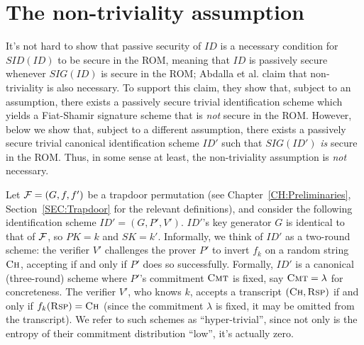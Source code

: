 \section{The non-triviality assumption}
\label{SEC:NonTriviality}

It's not hard to show that passive security of $ID$ is a necessary condition
for $SID(ID)$ to be secure in the ROM, meaning that $ID$ is passively secure
whenever $SIG(ID)$ is secure in the ROM; Abdalla et al. claim that
non-triviality is also necessary. To support this claim, they show that,
subject to an assumption, there exists a passively secure trivial
identification scheme which yields a Fiat-Shamir signature scheme that is
{\it not} secure in the ROM.
However, below we show that, subject to a different assumption, there exists a
passively secure trivial canonical identification scheme $ID'$
such that $SIG(ID')$ {\it is} secure in the ROM. 
Thus, in some sense at least, the non-triviality assumption is {\it not} 
necessary. 

Let $\mathcal{F} = (G,f,f')$ be a trapdoor permutation (see
Chapter~\ref{CH:Preliminaries}, Section~\ref{SEC:Trapdoor} for the relevant
definitions), and consider the following identification scheme $ID' =
(G,P',V')$. $ID'$'s key generator $G$ is identical to that of $\mathcal{F}$, so $PK
= k$ and $SK = k'$.  Informally, we think of $ID'$ as a two-round scheme: the
verifier $V'$ challenges the prover $P'$ to invert $f_k$ on a random string
$\textsc{Ch}$, accepting if and only if $P'$ does so successfully.  Formally,
$ID'$ is a canonical (three-round) scheme where $P'$'s commitment
$\textsc{Cmt}$ is fixed, say $\textsc{Cmt} = \lambda$ for concreteness. The
verifier $V'$, who knows $k$, accepts a transcript
$(\textsc{Ch},\textsc{Rsp})$  if and only if $f_{k}(\textsc{Rsp}) =
\textsc{Ch}$ (since the commitment $\lambda$ is fixed, it may be omitted from
the transcript).
We refer to such schemes as
``hyper-trivial'', since not only is the entropy of their commitment
distribution ``low'', it's actually zero.
%
%

